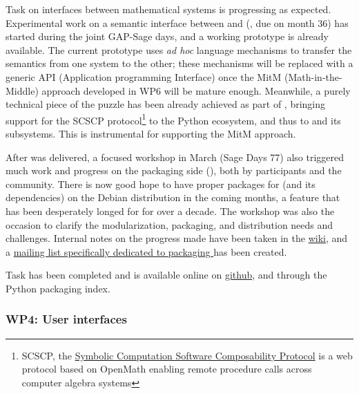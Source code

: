 \documentclass{deliverablereport}
\begin{document}
Task  on interfaces
between mathematical systems is progressing as expected. Experimental
work on a semantic interface between \GAP and \Sage
(, due
on month 36) has started during the joint GAP-Sage days, and a working
prototype is already available. The current prototype uses \emph{ad
  hoc} language mechanisms to transfer the semantics from one system
to the other; these mechanisms will be replaced with a generic API
(Application programming Interface) once the MitM (Math-in-the-Middle)
approach developed in WP6 will be mature enough. Meanwhile, a purely
technical piece of the puzzle has been already achieved as part of
, bringing support for the SCSCP
protocol\footnote{SCSCP, the
  \href{http://www.symbolic-computing.org/science/index.php/SCSCP}{Symbolic
    Computation Software Composability Protocol} is a web protocol
  based on OpenMath enabling remote procedure calls across computer
  algebra systems}
to the Python ecosystem, and thus to \Sage and its subsystems. This
is instrumental for supporting the MitM approach.

After  was
delivered, a focused workshop in March (Sage Days 77) also triggered
much work and progress on the packaging side
(), both by \ODK
participants and the community. There is now good hope to have proper
packages for \Sage (and its dependencies) on the Debian distribution
in the coming months, a feature that has been desperately longed for
for over a decade.  The workshop was also the occasion to clarify the
modularization, packaging, and distribution needs and
challenges. Internal notes on the progress made have been taken in the
\href{https://wiki.sagemath.org/days77/packaging}{\Sage wiki}, and a
\href{https://groups.google.com/forum/#!forum/sage-packaging}{mailing
  list specifically dedicated to packaging \Sage} has been created.

Task  has
been completed and is available online on
\href{https://github.com/joommf/oommfc}{github}, and through the
Python packaging index.

\subsubsection{WP4: User interfaces}
\end{document}
